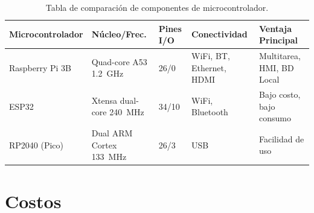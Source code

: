 \documentclass[11pt,tesis,twoside,openright,spanish]{upiiztt}
\begin{document}
\begin{table}[H]
\centering
\caption{Tabla de comparación de componentes de microcontrolador.}
\label{tab:comp_microcontrolador}
\small
\begin{tabular}{lllll}
\toprule
\textbf{Microcontrolador} & \textbf{Núcleo/Frec.} & \textbf{Pines I/O} & \textbf{Conectividad} & \textbf{Ventaja Principal} \\
\midrule
Raspberry Pi 3B  & Quad-core A53 1.2~GHz & 26/0 & WiFi, BT, Ethernet, HDMI & Multitarea, HMI, BD Local \\
ESP32            & Xtensa dual-core 240~MHz & 34/10 & WiFi, Bluetooth & Bajo costo, bajo consumo \\
RP2040 (Pico)    & Dual ARM Cortex 133~MHz & 26/3  & USB & Facilidad de uso \\
\bottomrule
\end{tabular}
\end{table}

\section*{Costos}
\end{document}
